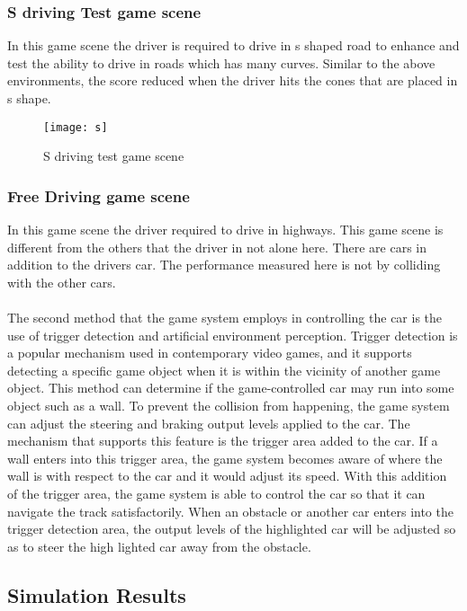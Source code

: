 \documentclass[12pt,a4paper]{article}
\begin{document}
\begin{center}
\begin{center}
\begin{center}
\begin{itemize}
\subsubsection{S driving Test game scene}

In this game scene the driver is required to drive in s shaped road to enhance and test the ability to drive in roads which has many curves. Similar to the above environments, the score reduced when the driver hits the cones that are placed in s shape. 
\begin{figure}
	\centering
	\texttt{[image: s]}
	\caption{S driving test game scene}
	\label{fig:s}
\end{figure}

\subsubsection{Free Driving game scene}

In this game scene the driver required to drive in highways. This game scene is different from the others that the driver in not alone here. There are cars in addition to the drivers car. The performance measured here is not by colliding with the other cars.\\
\\
The second method that the game system employs in controlling the car is the use of trigger detection and artificial environment perception. Trigger detection is a popular mechanism used in contemporary video games, and it supports detecting a specific game object when it is within the vicinity of another game object. This method can determine if the game-controlled car may run into some object such as a wall. To prevent the collision from happening, the game system can adjust the steering and braking output levels applied to the car. The mechanism that supports this feature is the trigger area added to the car. If a wall enters into this trigger area, the game system becomes aware of where the wall is with respect to the car and it would adjust its speed. With this addition of the trigger area, the game system is able to control the car so that it can navigate the track satisfactorily. When an obstacle or another car enters into the trigger detection area, the output levels of the highlighted car will be adjusted so as to steer the high lighted car away from the obstacle.


\subsection{Simulation Results }


\end{itemize}
\end{center}
\end{center}
\end{center}
\end{document}
